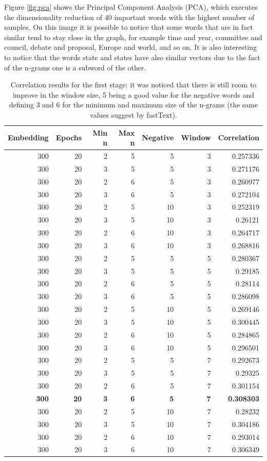 \documentclass[11pt,oneside,a4paper]{article}
\begin{document}
Figure \ref{fig:pca} shows the Principal Component Analysis (PCA), which executes the dimensionality reduction of 40 important words with the highest number of samples. On this image it is possible to notice that some words that are in fact similar tend to stay close in the graph, for example time and year, committee and council, debate and proposal, Europe and world, and so on. It is also interesting to notice that the words state and states have also similar vectors due to the fact of the n-grams one is a subword of the other.

\begin{table}[]
\centering
\begin{tabular}{rrrrrrr}
\hline
Embedding & Epochs & Min n & Max n & Negative & Window & Correlation \\ \hline
300 & 20 & 2 & 5 & 5 & 3 & 0.257336 \\
300 & 20 & 3 & 5 & 5 & 3 & 0.271176 \\
300 & 20 & 2 & 6 & 5 & 3 & 0.260977 \\
300 & 20 & 3 & 6 & 5 & 3 & 0.272104 \\
300 & 20 & 2 & 5 & 10 & 3 & 0.252319 \\
300 & 20 & 3 & 5 & 10 & 3 & 0.26121 \\
300 & 20 & 2 & 6 & 10 & 3 & 0.264717 \\
300 & 20 & 3 & 6 & 10 & 3 & 0.268816 \\
300 & 20 & 2 & 5 & 5 & 5 & 0.280367 \\
300 & 20 & 3 & 5 & 5 & 5 & 0.29185 \\
300 & 20 & 2 & 6 & 5 & 5 & 0.28114 \\
300 & 20 & 3 & 6 & 5 & 5 & 0.286098 \\
300 & 20 & 2 & 5 & 10 & 5 & 0.269146 \\
300 & 20 & 3 & 5 & 10 & 5 & 0.300445 \\
300 & 20 & 2 & 6 & 10 & 5 & 0.284865 \\
300 & 20 & 3 & 6 & 10 & 5 & 0.296501 \\
300 & 20 & 2 & 5 & 5 & 7 & 0.292673 \\
300 & 20 & 3 & 5 & 5 & 7 & 0.29325 \\
300 & 20 & 2 & 6 & 5 & 7 & 0.301154 \\
\textbf{300} & \textbf{20} & \textbf{3} & \textbf{6} & \textbf{5} & \textbf{7} & \textbf{0.308303} \\
300 & 20 & 2 & 5 & 10 & 7 & 0.28232 \\
300 & 20 & 3 & 5 & 10 & 7 & 0.304186 \\
300 & 20 & 2 & 6 & 10 & 7 & 0.293014 \\
300 & 20 & 3 & 6 & 10 & 7 & 0.306349 \\ \hline
\end{tabular}
\caption{Correlation results for the first stage: it was noticed that there is still room to improve in the window size, 5 being a good value for the negative words and defining 3 and 6 for the minimum and maximum size of the n-grams (the same values suggest by fastText).}
\label{tab:first-training}
\end{table}
\end{document}
